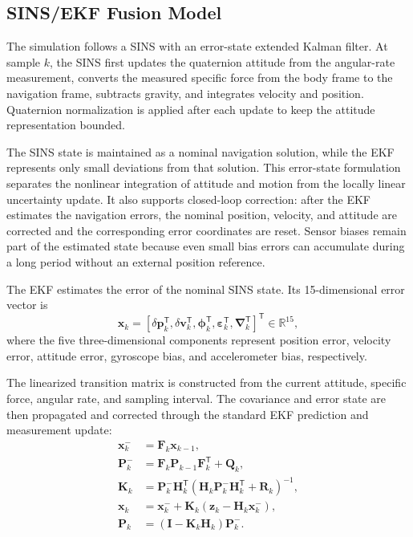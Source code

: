 \subsection{SINS/EKF Fusion Model}
\label{subsec:ekf-model}

The simulation follows a SINS with an error-state extended Kalman filter. At sample $k$, the SINS first updates the quaternion attitude from the angular-rate measurement, converts the measured specific force from the body frame to the navigation frame, subtracts gravity, and integrates velocity and position. Quaternion normalization is applied after each update to keep the attitude representation bounded.

The SINS state is maintained as a nominal navigation solution, while the EKF represents only small deviations from that solution. This error-state formulation separates the nonlinear integration of attitude and motion from the locally linear uncertainty update. It also supports closed-loop correction: after the EKF estimates the navigation errors, the nominal position, velocity, and attitude are corrected and the corresponding error coordinates are reset. Sensor biases remain part of the estimated state because even small bias errors can accumulate during a long period without an external position reference.

The EKF estimates the error of the nominal SINS state. Its 15-dimensional error vector is
\begin{equation}
  \mathbf{x}_k =
  [\delta\mathbf{p}_k^{\mathsf T},
   \delta\mathbf{v}_k^{\mathsf T},
   \boldsymbol{\phi}_k^{\mathsf T},
   \boldsymbol{\varepsilon}_k^{\mathsf T},
   \boldsymbol{\nabla}_k^{\mathsf T}]^{\mathsf T}
  \in \mathbb{R}^{15},
  \label{eq:error-state}
\end{equation}
where the five three-dimensional components represent position error, velocity error, attitude error, gyroscope bias, and accelerometer bias, respectively.

The linearized transition matrix is constructed from the current attitude, specific force, angular rate, and sampling interval. The covariance and error state are then propagated and corrected through the standard EKF prediction and measurement update:
\begin{align}
  \mathbf{x}_{k}^{-} &= \mathbf{F}_k\mathbf{x}_{k-1}, \\
  \mathbf{P}_{k}^{-} &= \mathbf{F}_k\mathbf{P}_{k-1}\mathbf{F}_k^{\mathsf T}+\mathbf{Q}_k, \\
  \mathbf{K}_k &= \mathbf{P}_{k}^{-}\mathbf{H}_k^{\mathsf T}
  (\mathbf{H}_k\mathbf{P}_{k}^{-}\mathbf{H}_k^{\mathsf T}+\mathbf{R}_k)^{-1}, \\
  \mathbf{x}_k &= \mathbf{x}_{k}^{-}+\mathbf{K}_k
  (\mathbf{z}_k-\mathbf{H}_k\mathbf{x}_{k}^{-}), \\
  \mathbf{P}_k &= (\mathbf{I}-\mathbf{K}_k\mathbf{H}_k)\mathbf{P}_{k}^{-}.
  \label{eq:ekf-update}
\end{align}

